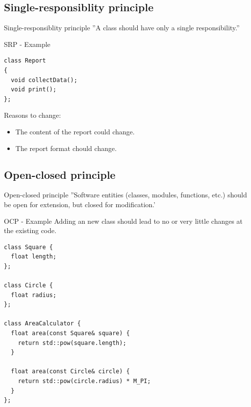 \documentclass{beamer}
\begin{document}
\subsection{Single-responsiblity principle}

\begin{frame}[fragile]{Single-responsiblity principle}
''A class should have only a single responsibility.''
\end{frame}

\begin{frame}[fragile]{SRP - Example}
\begin{lstlisting}[caption=SRP Anti-Example]
class Report
{
  void collectData();
  void print();
};
\end{lstlisting}

\begin{block}{Reasons to change:}
\begin{itemize}
  \item The content of the report could change.
  \item The report format chould change.
\end{itemize}
\end{block}
\end{frame}


\subsection{Open-closed principle}

\begin{frame}{Open-closed principle}
''Software entities (classes, modules, functions, etc.) should be open for
extension, but closed for modification.'
\end{frame}

\begin{frame}[fragile]{OCP - Example}
Adding an new class should lead to no or very little changes at the existing
code.

\begin{lstlisting}[caption=OCP Anti-Example]
class Square {
  float length;
};

class Circle {
  float radius;
};

class AreaCalculator {
  float area(const Square& square) {
    return std::pow(square.length);
  }
  
  float area(const Circle& circle) {
    return std::pow(circle.radius) * M_PI;
  }
};
\end{lstlisting}
\end{frame}
\end{document}
